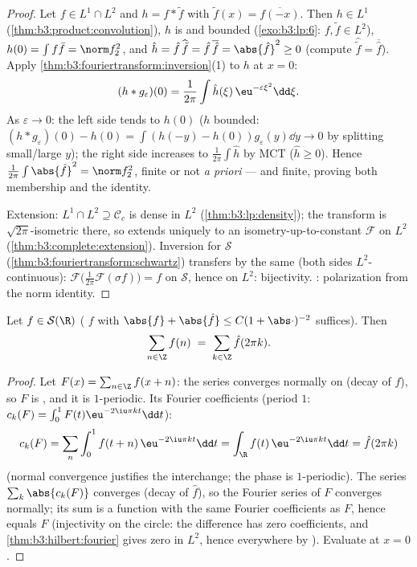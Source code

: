 \begin{proof}
Let $f \in L^1\cap L^2$ and $h = f * \tilde f$ with
$\tilde f(x) = \overline{f(-x)}$. Then $h \in L^1$
(\cref{thm:b3:product:convolution}), $h$ is  and
bounded (\cref{exo:b3:lp:6}: $f, \tilde f \in L^2$), $h(0) =
\int f\bar f = \norm f_2^2$, and $\hat h = \hat
f\,\widehat{\tilde f} = \hat f\,\overline{\hat f} =
\abs{\hat f}^2 \geq 0$ (compute $\widehat{\tilde f} =
\overline{\hat f}$). Apply
\cref{thm:b3:fouriertransform:inversion}(1) to $h$ at $x = 0$:
\[
(h * g_\varepsilon)(0) = \frac1{2\pi}\int \hat
h(\xi)\,\eu^{-\varepsilon\xi^2}\dd\xi .
\]
As $\varepsilon \to 0$: the left side tends to $h(0)$ ($h$
 bounded: $(h*g_\varepsilon)(0) - h(0) = \int(h(-y)
- h(0))g_\varepsilon(y)\dd y \to 0$ by splitting small/large
$y$); the right side increases to $\frac1{2\pi}\int\hat h$ by
MCT ($\hat h \geq 0$). Hence $\frac1{2\pi}\int\abs{\hat f}^2 =
\norm f_2^2$, finite or not \emph{a priori} --- and finite,
proving both membership and the identity.

Extension: $L^1\cap L^2 \supseteq \mathcal C_c$ is dense in
$L^2$ (\cref{thm:b3:lp:density}); the transform is
$\sqrt{2\pi}$-isometric there, so extends uniquely to an
isometry-up-to-constant $\mathcal F$ on $L^2$
(\cref{thm:b3:complete:extension}). Inversion for $\mathcal S$
(\cref{thm:b3:fouriertransform:schwartz}) transfers by the
same  (both sides $L^2$-continuous): $\mathcal
F\bigl(\frac1{2\pi}\mathcal F(\sigma f)\bigr) = f$ on
$\mathcal S$, hence on $L^2$: bijectivity. :
polarization from the norm identity.
\end{proof}

\begin{theorem}
\label{thm:b3:fouriertransform:poisson}
Let $f \in \mathcal S(\R)$ ( $f$ with $\abs{f} +
\abs{\hat f} \leq C(1 + \abs\cdot)^{-2}$
suffices). Then
\[
\sum_{n\in\Z} f(n) \;=\; \sum_{k\in\Z}\hat f(2\pi k) .
\]
\end{theorem}

\begin{proof}
Let $F(x) = \sum_{n\in\Z}f(x + n)$: the series converges
normally on  (decay of $f$), so $F$ is , and
it is $1$-periodic. Its Fourier coefficients (period $1$:
$c_k(F) = \int_0^1F(t)\eu^{-2\iu\pi kt}\dd t$):
\[
c_k(F) = \sum_n\int_0^1 f(t + n)\,\eu^{-2\iu\pi kt}\dd t
= \int_\R f(t)\,\eu^{-2\iu\pi kt}\dd t = \hat f(2\pi k)
\]
(normal convergence justifies the interchange; the phase is
$1$-periodic). The series $\sum_k\abs{c_k(F)}$ converges
(decay of $\hat f$), so the Fourier series of $F$ converges
normally; its sum is a  function with the same
Fourier coefficients as $F$, hence equals $F$ (injectivity on
the circle: the difference has zero coefficients, and
\cref{thm:b3:hilbert:fourier} gives zero in $L^2$, hence
everywhere by ). Evaluate at $x = 0$.
\end{proof}

